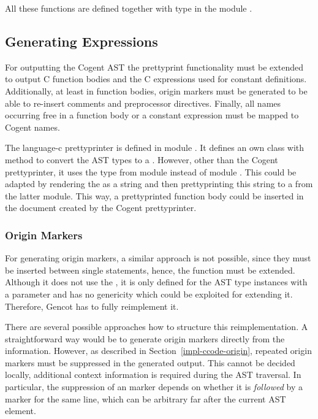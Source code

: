 All these functions are defined together with type  in the module .

\subsection{Generating Expressions}
\label{impl-ccode-expr}

For outputting the Cogent AST the prettyprint functionality must be extended to 
output C function bodies and the C expressions used for constant definitions. Additionally, at least in function bodies,
origin markers must be generated to be able to re-insert comments and preprocessor directives. Finally, all names
occurring free in a function body or a constant expression must be mapped to Cogent names.

The language-c prettyprinter is defined in module . It defines an own class  with 
method  to convert the AST types to a . However, other than the Cogent prettyprinter, it uses 
the type  from module  instead of module .
This could be adapted by rendering the  as a string and then prettyprinting this string to a 
from the latter module. This way, a prettyprinted function body could be inserted in the document created by the
Cogent prettyprinter.

\subsubsection{Origin Markers}

For generating origin markers, a similar approach is not possible, since they must be inserted between single statements,
hence, the function  must be extended. Although it does not use the , it is only defined for
the AST type instances with a  parameter and has no genericity which could be exploited for extending it.
Therefore, Gencot has to fully reimplement it. 

There are several possible approaches how to structure this reimplementation. A straightforward way would be to generate
origin markers directly from the  information. However, as described in Section~\ref{impl-ccode-origin},
repeated origin markers must be suppressed in the generated output. This cannot be decided locally, additional context
information is required during the AST traversal. In particular, the suppression of an  marker depends
on whether it is \textit{followed} by a marker for the same line, which can be arbitrary far after the current 
AST element.

